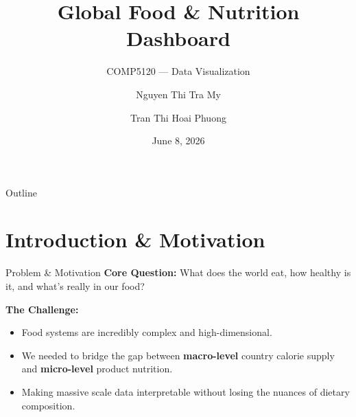 \documentclass[aspectratio=169]{beamer}
\title{Global Food \& Nutrition Dashboard}
\subtitle{COMP5120 — Data Visualization}
\author{Nguyen Thi Tra My \and Tran Thi Hoai Phuong}
\institute{VinUniversity}
\date{June 8, 2026}
\begin{document}
\AtBeginSection[]{}

\begin{frame}
    \titlepage
\end{frame}

\begin{frame}{Outline}
    \tableofcontents[hideallsubsections]
\end{frame}

\section{Introduction \& Motivation}
\begin{frame}{Problem \& Motivation}
    \textbf{Core Question:} What does the world eat, how healthy is it, and what's really in our food?
    
    \vspace{0.5cm}
    \textbf{The Challenge:}
    \begin{itemize}
        \item Food systems are incredibly complex and high-dimensional.
        \item We needed to bridge the gap between \textbf{macro-level} country calorie supply and \textbf{micro-level} product nutrition.
        \item Making massive scale data interpretable without losing the nuances of dietary composition.
    \end{itemize}
\end{frame}
\end{document}
